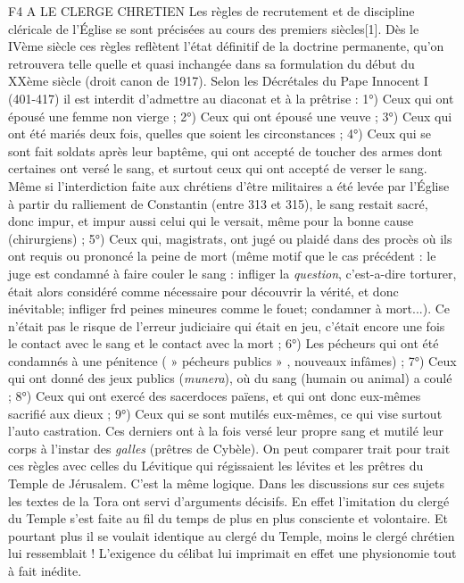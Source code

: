F4 A LE CLERGE CHRETIEN
 Les règles de recrutement et de discipline cléricale de l'Église se sont précisées au cours des premiers siècles[1]. Dès le IVème siècle ces règles reflètent l'état définitif de la doctrine permanente, qu'on retrouvera telle quelle et quasi inchangée dans sa formulation du début du XXème siècle (droit canon de 1917). Selon les Décrétales du Pape Innocent I (401-417) il est interdit d'admettre au diaconat et à la prêtrise : 1°) Ceux qui ont épousé une femme non vierge ; 2°) Ceux qui ont épousé une veuve ; 3°) Ceux qui ont été mariés deux fois, quelles que soient les circonstances ; 4°) Ceux qui se sont fait soldats après leur baptême, qui ont accepté de toucher des armes dont certaines ont versé le sang, et surtout ceux qui ont accepté de verser le sang. Même si l'interdiction faite aux chrétiens d'être militaires a été levée par l'Église à partir du ralliement de Constantin (entre 313 et 315), le sang restait sacré, donc impur, et impur aussi celui qui le versait, même pour la bonne cause (chirurgiens) ; 5°) Ceux qui, magistrats, ont jugé ou plaidé dans des procès où ils ont requis ou prononcé la peine de mort (même motif que le cas précédent : le juge est condamné à faire couler le sang : infliger la \emph{question}, c'est-a-dire torturer, était alors considéré comme nécessaire pour découvrir la vérité, et donc inévitable; infliger frd peines mineures comme le fouet; condamner à mort...). Ce n'était pas le risque de l'erreur judiciaire qui était en jeu, c'était encore une fois le contact avec le sang et le contact avec la mort ; 6°) Les pécheurs qui ont été condamnés à une pénitence ( » pécheurs publics » , nouveaux infâmes) ; 7°) Ceux qui ont donné des jeux publics (\emph{munera}), où du sang (humain ou animal) a coulé ; 8°) Ceux qui ont exercé des sacerdoces païens, et qui ont donc eux-mêmes sacrifié aux dieux ; 9°) Ceux qui se sont mutilés eux-mêmes, ce qui vise surtout l'auto castration. Ces derniers ont à la fois versé leur propre sang et mutilé leur corps à l'instar des \emph{galles} (prêtres de Cybèle).
 On peut comparer trait pour trait ces règles avec celles du Lévitique qui régissaient les lévites et les prêtres du Temple de Jérusalem. C'est la même logique. Dans les discussions sur ces sujets les textes de la Tora ont servi d'arguments décisifs. En effet l'imitation du clergé du Temple s'est faite au fil du temps de plus en plus consciente et volontaire. Et pourtant plus il se voulait identique au clergé du Temple, moins le clergé chrétien lui ressemblait ! L'exigence du célibat lui imprimait en effet une physionomie tout à fait inédite. 
